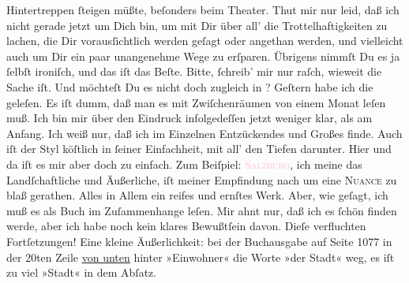                Hintertreppen ſteigen müßte, beſonders beim Theater. Thut mir nur leid, daß ich nicht
               gerade jetzt um Dich bin, um {\pb}mit Dir über all’ die
               Trottelhaftigkeiten zu lachen, die Dir vorausſichtlich werden geſagt oder angethan
               werden, und vielleicht auch um Dir ein paar unangenehme Wege zu erſparen. Übrigens
               nimmſt Du es ja ſelbſt ironiſch, und das iſt das Beſte. Bitte, ſchreib’ mir nur
               raſch, wieweit die Sache iſt. Und möchteſt Du es nicht doch zugleich in \label{K_L02620_3v}\label{K_L02620_3h}?\pend
           \pstart
           Geſtern habe ich die \label{K_L02620_4v}\label{K_L02620_4h}
               geleſen. Es iſt dumm, daß man es mit Zwiſchenräumen  von einem Monat leſen muß. Ich bin mir über den Eindruck infolgedeſſen
               jetzt weniger {\pb}klar, als am Anfang. Ich weiß nur,
               daß ich im Einzelnen Entzückendes und Großes finde. Auch iſt der Styl köſtlich in
               ſeiner Einfachheit, mit all’ den Tiefen darunter.  Hier und da iſt es mir aber doch zu einfach. Zum Beiſpiel: \textsc{\textcolor{pink}{Salzburg}{}\ledrightnote{\textcolor{pink}{Salzburg}}}, ich meine das Landſchaftliche und Äußerliche, iſt meiner Empfindung nach um
               eine \textsc{Nuance} zu blaß gerathen. Alles in Allem ein reifes und
               ernſtes Werk. Aber, wie geſagt, ich muß es als Buch im Zuſammenhange leſen. Mir ahnt
               nur, daß ich es ſchön finden werde, {\pb}aber ich habe
               noch kein klares Bewußtſein davon. Dieſe verfluchten Fortſetzungen! Eine kleine
               Äußerlichkeit: bei der Buchausgabe \label{K_L02620_5v}\label{K_L02620_5h} auf Seite 1077 in der 20ten Zeile \uline{von unten} hinter »Einwohner« die Worte »der Stadt« weg, es iſt zu viel
               »Stadt« in dem Abſatz.\pend
